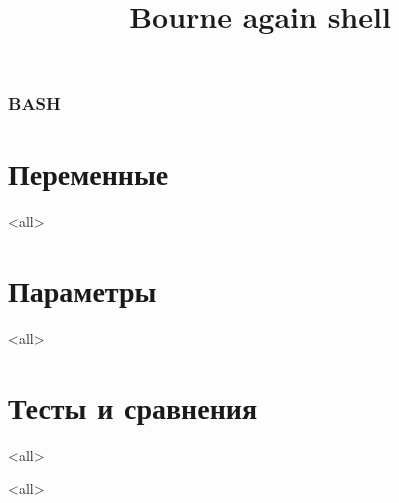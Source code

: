 
\title[bash]{Bourne again shell}




\begin{frame}
	\frametitle{BASH}
	\titlepage
	\vspace{-0.5cm}
	\begin{center}
	\end{center}
\end{frame}



\section{Переменные}

\mode<all>{}

\section{Параметры}

\mode<all>{}

\section{Тесты и сравнения}

\mode<all>{}


\mode<all>

